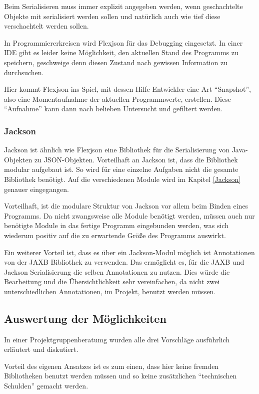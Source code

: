 Beim Serialisieren muss immer explizit angegeben werden, wenn geschachtelte Objekte mit serialisiert werden sollen und nat\"urlich auch wie tief diese verschachtelt werden sollen.

In Programmiererkreisen wird Flexjson f\"ur das Debugging eingesetzt. In einer IDE gibt es leider keine M\"oglichkeit, den aktuellen Stand des Programms zu speichern, geschweige denn diesen Zustand nach gewissen Information zu durchsuchen. \cite{FlexJSONDebug}

Hier kommt Flexjson ins Spiel, mit dessen Hilfe Entwickler eine Art "`Snapshot"', also eine Momentaufnahme der aktuellen Programmwerte, erstellen. Diese "`Aufnahme"' kann dann nach belieben Untersucht und gefiltert werden.

\subsubsection{Jackson}
Jackson ist \"ahnlich wie Flexjson eine Bibliothek f\"ur die Serialisierung von Java-Objekten zu \ac{JSON}-Objekten. Vorteilhaft an Jackson ist, dass die Bibliothek modular aufgebaut ist. So wird f\"ur eine einzelne Aufgaben nicht die gesamte Bibliothek ben\"otigt. Auf die verschiedenen Module wird im Kapitel \ref{Jackson} genauer eingegangen.

Vorteilhaft, ist die modulare Struktur von Jackson vor allem beim Binden eines Programms. Da nicht zwangsweise alle Module ben\"otigt werden, m\"ussen auch nur ben\"otigte Module in das fertige Programm eingebunden werden, was sich wiederum positiv auf die zu erwartende Gr\"o\ss{}e des Programms auswirkt.
\cite{Jackson}

Ein weiterer Vorteil ist, dass es \"uber ein Jackson-Modul m\"oglich ist Annotationen von der \ac{JAXB} Bibliothek zu verwenden. Das
erm\"oglicht es, f\"ur die \ac{JAXB} und Jackson Serialisierung die selben Annotationen zu nutzen. Dies w\"urde die Bearbeitung und die \"Ubersichtlichkeit sehr vereinfachen, da nicht zwei unterschiedlichen Annotationen, im Projekt, benutzt werden m\"ussen.

\subsection{Auswertung der M\"oglichkeiten}
In einer Projektgruppenberatumg wurden alle drei Vorschl\"age ausf\"uhrlich erl\"autert und diskutiert. 

Vorteil des eigenen Ansatzes ist es zum einen, dass hier keine fremden Bibliotheken benutzt werden m\"ussen und so keine zus\"atzlichen "`technischen Schulden"' gemacht werden. 

